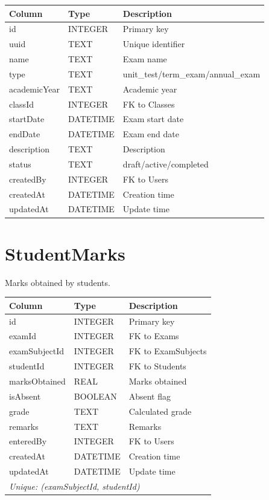 \documentclass[12pt,a4paper]{report}
\begin{document}
\begin{longtable}{@{}p{4cm}p{2.5cm}p{6.5cm}@{}}
\toprule
\textbf{Column} & \textbf{Type} & \textbf{Description} \\
\midrule
\endhead
id & INTEGER & Primary key \\
uuid & TEXT & Unique identifier \\
name & TEXT & Exam name \\
type & TEXT & unit\_test/term\_exam/annual\_exam \\
academicYear & TEXT & Academic year \\
classId & INTEGER & FK to Classes \\
startDate & DATETIME & Exam start date \\
endDate & DATETIME & Exam end date \\
description & TEXT & Description \\
status & TEXT & draft/active/completed \\
createdBy & INTEGER & FK to Users \\
createdAt & DATETIME & Creation time \\
updatedAt & DATETIME & Update time \\
\bottomrule
\end{longtable}

\section{StudentMarks}

Marks obtained by students.

\begin{longtable}{@{}p{4cm}p{2.5cm}p{6.5cm}@{}}
\toprule
\textbf{Column} & \textbf{Type} & \textbf{Description} \\
\midrule
\endhead
id & INTEGER & Primary key \\
examId & INTEGER & FK to Exams \\
examSubjectId & INTEGER & FK to ExamSubjects \\
studentId & INTEGER & FK to Students \\
marksObtained & REAL & Marks obtained \\
isAbsent & BOOLEAN & Absent flag \\
grade & TEXT & Calculated grade \\
remarks & TEXT & Remarks \\
enteredBy & INTEGER & FK to Users \\
createdAt & DATETIME & Creation time \\
updatedAt & DATETIME & Update time \\
\multicolumn{3}{l}{\textit{Unique: (examSubjectId, studentId)}} \\
\bottomrule
\end{longtable}
\end{document}
